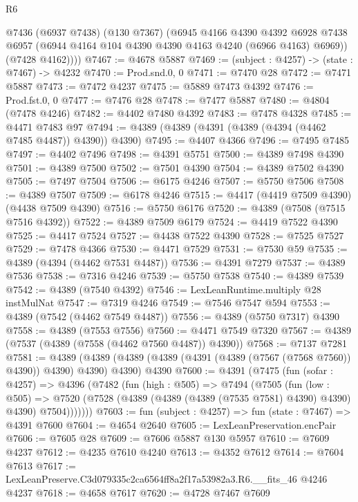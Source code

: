 \begin{lexlean}{R6}
\begin{coremodule}
        @7436
          (@6937 @7438)
          (@130 @7367)
          (@6945
            @4166
            @4390
            @4392
            @6928
            @7438
            @6957
            (@6944 @4164 @104 @4390 @4390 @4163 @4240 (@6966 @4163) @6969))
          (@7428 @4162))))
@7467 := @4678 @5887
@7469 := (subject : @4257) -> (state : @7467) -> @4232
@7470 := Prod.snd.{0, 0}
@7471 := @7470 @28
@7472 := @7471 @5887
@7473 := @7472 @4237
@7475 := @5889 @7473 @4392
@7476 := Prod.fst.{0, 0}
@7477 := @7476 @28
@7478 := @7477 @5887
@7480 := @4804 (@7478 @4246)
@7482 := @4402 @7480 @4392
@7483 := @7478 @4328
@7485 := @4471 @7483 @97
@7494 := @4389 (@4389 (@4391 (@4389 (@4394 (@4462 @7485 @4487)) @4390)) @4390)
@7495 := @4407 @4366
@7496 := @7495 @7485
@7497 := @4402 @7496
@7498 := @4391 @5751
@7500 := @4389 @7498 @4390
@7501 := @4389 @7500
@7502 := @7501 @4390
@7504 := @4389 @7502 @4390
@7505 := @7497 @7504
@7506 := @6175 @4246
@7507 := @5750 @7506
@7508 := @4389 @7507
@7509 := @6178 @4246
@7515 := @4417 (@4419 @7509 @4390) (@4438 @7509 @4390)
@7516 := @5750 @6176
@7520 := @4389 (@7508 (@7515 @7516 @4392))
@7522 := @4389 @7509 @6179
@7524 := @4419 @7522 @4390
@7525 := @4417 @7524
@7527 := @4438 @7522 @4390
@7528 := @7525 @7527
@7529 := @7478 @4366
@7530 := @4471 @7529
@7531 := @7530 @59
@7535 := @4389 (@4394 (@4462 @7531 @4487))
@7536 := @4391 @7279
@7537 := @4389 @7536
@7538 := @7316 @4246
@7539 := @5750 @7538
@7540 := @4389 @7539
@7542 := @4389 (@7540 @4392)
@7546 := LexLeanRuntime.multiply @28 instMulNat
@7547 := @7319 @4246
@7549 := @7546 @7547 @594
@7553 := @4389 (@7542 (@4462 @7549 @4487))
@7556 := @4389 (@5750 @7317) @4390
@7558 := @4389 (@7553 @7556)
@7560 := @4471 @7549 @7320
@7567 := @4389 (@7537 (@4389 (@7558 (@4462 @7560 @4487)) @4390))
@7568 := @7137 @7281
@7581 := @4389
    (@4389 (@4389 (@4389 (@4391 (@4389 (@7567 (@7568 @7560)) @4390)) @4390) @4390) @4390)
    @4390
@7600 := @4391
    (@7475
      (fun (sofar : @4257) =>
      @4396
        (@7482
          (fun (high : @505) =>
          @7494
            (@7505
              (fun (low : @505) =>
              @7520 (@7528 (@4389 (@4389 (@4389 (@7535 @7581) @4390) @4390) @4390) @7504)))))))
@7603 := fun (subject : @4257) => fun (state : @7467) => @4391 @7600
@7604 := @4654 @2640
@7605 := LexLeanPreservation.encPair
@7606 := @7605 @28
@7609 := @7606 @5887 @130 @5957
@7610 := @7609 @4237
@7612 := @4235 @7610 @4240
@7613 := @4352 @7612
@7614 := @7604 @7613
@7617 := LexLeanPreserve.C3d079335c2ca6564ff8a2f17a53982a3.R6.__fits_46 @4246 @4237
@7618 := @4658 @7617
@7620 := @4728 @7467 @7609

\end{coremodule}
\end{lexlean}
